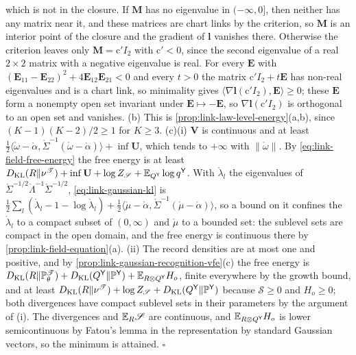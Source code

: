which is not in the closure. If $\mathbf M$ has no eigenvalue in $(-\infty,0]$, then neither has any matrix
near it, and these matrices are chart links by the criterion, so $\mathbf M$ is an interior point of the
closure and the gradient of $\mathbf l$ vanishes there. Otherwise the criterion leaves only $\mathbf M=\mathrm c'I_2$ with $\mathrm c'<0$, since the second
eigenvalue of a real $2\times2$ matrix with a negative eigenvalue is real. For every $\mathbf E$ with
$(\mathbf E_{11}-\mathbf E_{22})^2+4\mathbf E_{12}\mathbf E_{21}<0$ and every $t>0$ the matrix $\mathrm c'I_2+t\mathbf E$ has
non-real eigenvalues and is a chart link, so minimality gives
$\langle\nabla\mathbf l(\mathrm c'I_2),\mathbf E\rangle\geq0$; these $\mathbf E$ form a nonempty open set invariant
under $\mathbf E\mapsto-\mathbf E$, so $\nabla\mathbf l(\mathrm c'I_2)$ is orthogonal to an open set and vanishes.
(b) This is \cref{prop:link-law-level-energy}(a,b), since
$(K-1)(K-2)/2\geq1$ for $K\geq3$. (c)(i) $\mathbf V$ is continuous and at least
$\frac12\langle\mathring\omega-\mathring\alpha,\mathring\Sigma^{-1}(\mathring\omega-\mathring\alpha)\rangle+\inf\mathbf U$, which tends to
$+\infty$ with $\lVert\mathring\omega\rVert$. By \eqref{eq:link-field-free-energy} the free energy is at least
$D_{\mathrm{KL}}(R\Vert\nu^{\mathscr T})+\inf\mathbf U+\log Z_{\mathscr S}+\mathbb E_{Q^{\mathsf Y}}\log q^{\mathsf Y}$. With $\mathring\lambda_l$ the
eigenvalues of $\mathring\Sigma^{-1/2}\mathring\Lambda^{-1}\mathring\Sigma^{-1/2}$, \eqref{eq:link-gaussian-kl} is
$\frac12\sum_l(\mathring\lambda_l-1-\log\mathring\lambda_l)+\frac12\langle\mathring\mu-\mathring\alpha,\mathring\Sigma^{-1}(\mathring\mu-\mathring\alpha)\rangle$,
so a bound on it confines the $\mathring\lambda_l$ to a compact subset of $(0,\infty)$ and $\mathring\mu$ to a bounded set:
the sublevel sets are compact in the open domain, and the free energy is continuous there by
\cref{prop:link-field-equation}(a). (ii) The record densities are at most one and positive, and by
\cref{prop:link-gaussian-recognition-vfe}(c) the free energy is
$D_{\mathrm{KL}}(R\Vert\mathbb P^{\mathscr T}_\theta)+D_{\mathrm{KL}}(Q^{\mathsf Y}\Vert\mathbb P^{\mathsf Y})+\mathbb E_{R\otimes Q^{\mathsf Y}}H_o$, finite everywhere by the
growth bound, and at least $D_{\mathrm{KL}}(R\Vert\nu^{\mathscr T})+\log Z_{\mathscr S}+D_{\mathrm{KL}}(Q^{\mathsf Y}\Vert\mathbb P^{\mathsf Y})$ because
$\mathscr S\geq0$ and $H_o\geq0$; both divergences have compact sublevel sets in their parameters by the
argument of (i). The divergences and $\mathbb E_R\mathscr S$ are continuous, and $\mathbb E_{R\otimes Q^{\mathsf Y}}H_o$ is lower
semicontinuous by Fatou's lemma in the representation by standard Gaussian vectors, so the minimum is
attained. \hfill$\square$

